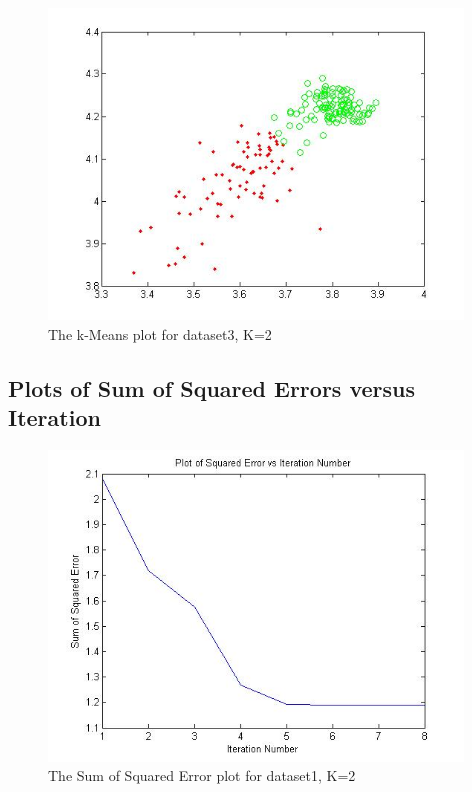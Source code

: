 \documentclass[11pt,psfig]{article}
\begin{document}
\begin{figure}[H]
\centering
\includegraphics[height=3.25in]{dataset3_kMeansPlot.jpg}
\caption{The k-Means plot for dataset3, K=2}
\end{figure}

\subsection*{Plots of Sum of Squared Errors versus Iteration}

\begin{figure}[H]
\centering
\includegraphics[height=3.25in]{dataset1_kMeans_squaredErrorPlot.jpg}
\caption{The Sum of Squared Error plot for dataset1, K=2}
\end{figure}
\end{document}
